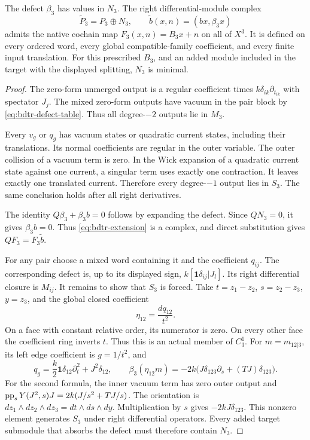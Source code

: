 \begin{theorem}\label{thm:bdtr-native-extension}
The defect $\beta_3$ has values in $N_3$.
The right differential-module complex
\begin{equation}\label{eq:bdtr-extension}
 \widetilde P_3=P_3\oplus N_3,
 \qquad \widetilde b(x,n)=(bx,\beta_3x)
\end{equation}
admits the native cochain map
$F_3(x,n)=B_3x+n$ on all of $X^3$.
It is defined on every ordered word, every global compatible-family coefficient, and every finite input translation.
For this prescribed $B_3$, and an added module included in the target with the displayed splitting, $N_3$ is minimal.
\end{theorem}
\begin{proof}
The zero-form unmerged output is a regular coefficient times $k\delta_{ik}\partial_{t_{ik}}$ with spectator $J_j$.
The mixed zero-form outputs have vacuum in the pair block by \eqref{eq:bdtr-defect-table}.
Thus all degree-$-2$ outputs lie in $M_3$.

Every $v_g$ or $q_g$ has vacuum states or quadratic current states, including their translations.
Its normal coefficients are regular in the outer variable.
The outer collision of a vacuum term is zero.
In the Wick expansion of a quadratic current state against one current, a singular term uses exactly one contraction.
It leaves exactly one translated current.
Therefore every degree-$-1$ output lies in $S_3$.
The same conclusion holds after all right derivatives.

The identity $Q\beta_3+\beta_3b=0$ follows by expanding the defect.
Since $QN_3=0$, it gives $\beta_3b=0$.
Thus \eqref{eq:bdtr-extension} is a complex, and direct substitution gives $QF_3=F_3\widetilde b$.

For any pair choose a mixed word containing it and the coefficient $q_{ij}$.
The corresponding defect is, up to its displayed sign, $k[\mathbf1\delta_{ij}|J_l]$.
Its right differential closure is $M_{ij}$.
It remains to show that $S_3$ is forced.
Take $t=z_1-z_2$, $s=z_2-z_3$, $y=z_3$, and the global closed coefficient
\begin{equation}\label{eq:bdtr-eta}
 \eta_{12}=\frac{dq_{12}}{t^2}.
\end{equation}
On a face with constant relative order, its numerator is zero.
On every other face the coefficient ring inverts $t$.
Thus this is an actual member of $C_3^1$.
For $m=m_{12|3}$, its left edge coefficient is $g=1/t^2$, and
\begin{equation}\label{eq:bdtr-small-witness}
 q_g=\frac{k}{2}\mathbf1\delta_{12}\partial_t^2+J^2\delta_{12},
 \qquad
 \beta_3(\eta_{12}m)
 =-2k\bigl(J\delta_{123}\partial_s+(TJ)\delta_{123}\bigr).
\end{equation}
For the second formula, the inner vacuum term has zero outer output and
$\operatorname{pp}_sY(J^2,s)J=2k(J/s^2+TJ/s)$.
The orientation is $dz_1\wedge dz_2\wedge dz_3=dt\wedge ds\wedge dy$.
Multiplication by $s$ gives $-2kJ\delta_{123}$.
This nonzero element generates $S_3$ under right differential operators.
Every added target submodule that absorbs the defect must therefore contain $N_3$.
\end{proof}

